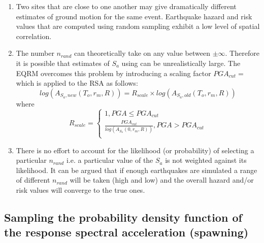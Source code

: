 \begin{enumerate}
\item Two sites that are close to one another may give
dramatically different estimates of ground motion for the same
event. Earthquake hazard and risk values that are computed using
random sampling exhibit a low level of spatial correlation.
\item
The number $n_{rand}$ can theoretically take on any value between
$\pm \infty$. Therefore it is possible that estimates of $S_a$ using
 can be unrealistically large. The EQRM
overcomes this problem by introducing a scaling factor
$PGA_{cut}=$ which is
applied to the RSA as follows:
\begin{equation}
 log(A_{S_a,new}(T_o,r_m,R)) = R_{scale} \times
log(A_{S_a,old}(T_o,r_m,R))
\end{equation}
where
\begin{equation}\label{rw}
R_{scale}  =
\begin{cases}
1,  PGA \leq PGA_{cut}\\
\frac{PGA_{cut}}{log(A_{S_a}(0,r_m,R))},
PGA > PGA_{cut}\\
\end{cases}
\end{equation}

\item There is no effort to account for the likelihood (or
probability) of selecting a particular $n_{rand}$ i.e. a particular
value of the $S_a$ is not weighted against its likelihood. It can be
argued that if enough earthquakes are simulated a range of different
$n_{rand}$ will be taken (high and low) and the overall hazard
and/or risk values will converge to the true ones.
\end{enumerate}


\subsection{Sampling the probability density function of
the response spectral acceleration (spawning)} \label{attn:uncert-pdfchoice}


